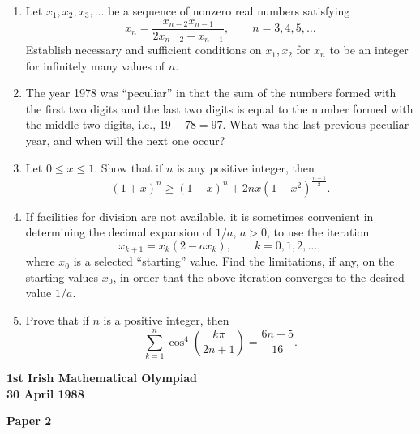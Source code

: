 \documentclass[12pt]{article}
\begin{document}
\begin{enumerate}
\item Let $x_1, x_2, x_3, \ldots$ be a sequence of nonzero real numbers satisfying \[x_n = \frac{x_{n-2}x_{n-1}}{2x_{n-2} - x_{n-1}}, \qquad n = 3, 4, 5, \ldots\] Establish necessary and sufficient conditions on $x_1, x_2$ for $x_n$ to be an integer for infinitely many values of $n$.

\item The year 1978 was ``peculiar'' in that the sum of the numbers formed with the first two digits and the last two digits is equal to the number formed with the middle two digits, i.e., $19 + 78 = 97$. What was the last previous peculiar year, and when will the next one occur?

\item Let $0 \le x \le 1$. Show that if $n$ is any positive integer, then \[(1+x)^n \ge (1-x)^n + 2nx(1-x^2)^{\frac{n-1}{2}}.\]

\item If facilities for division are not available, it is sometimes convenient in determining the decimal expansion of $1/a$, $a > 0$, to use the iteration \[x_{k+1} = x_k(2 - ax_k), \qquad k = 0, 1, 2, \ldots,\] where $x_0$ is a selected ``starting'' value. Find the limitations, if any, on the starting values $x_0$, in order that the above iteration converges to the desired value $1/a$.

\item Prove that if $n$ is a positive integer, then \[\sum_{k=1}^{n} \cos^4\left(\frac{k\pi}{2n+1}\right) = \frac{6n-5}{16}.\]

\end{enumerate}

\newpage

\begin{center}
{\large\bfseries 1st Irish Mathematical Olympiad\\
30 April 1988}
\end{center}

\bigskip
\noindent\textbf{Paper 2}
\bigskip
\end{document}
